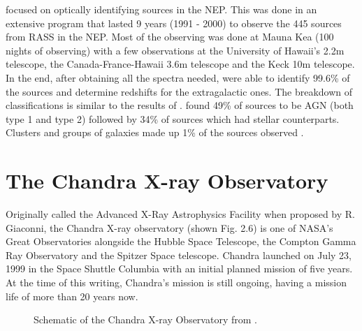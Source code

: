 \cite{gioia2003} focused on optically identifying sources in the NEP.
This was done in an extensive program that lasted 9 years (1991 - 2000) to observe the 445 sources from RASS in the NEP. 
Most of the observing was done at Mauna Kea (100 nights of observing) with a few observations at the University of Hawaii’s 2.2m telescope, the Canada-France-Hawaii 3.6m telescope and the Keck 10m telescope. 
In the end, after obtaining all the spectra needed, \cite{gioia2003} were able to identify 99.6\% of the sources and determine redshifts for the extragalactic ones.
The breakdown of classifications is similar to the results of \cite{zickgraf2003}.  
\cite{gioia2003} found 49\% of sources to be AGN (both type 1 and type 2) followed by 34\% of sources which had stellar counterparts. 
Clusters and groups of galaxies made up 1\% of the sources observed \citep{gioia2003}.




\section{The Chandra X-ray Observatory}
\label{2_3}


Originally called the Advanced X-Ray Astrophysics Facility when proposed by R. Giaconni, the Chandra X-ray observatory (shown Fig. 2.6) is one of NASA’s Great Observatories alongside the Hubble Space Telescope, the Compton Gamma Ray Observatory and the Spitzer Space telescope. 
Chandra launched on July 23, 1999 in the Space Shuttle Columbia with an initial planned mission of five years. 
At the time of this writing, Chandra’s mission is still ongoing, having a mission life of more than 20 years now.


\begin{figure}[H]
\centering
{}
\caption{Schematic of the Chandra X-ray Observatory from \cite{weisskopf1999}. }
\label{imbeded_fb}
\end{figure}

